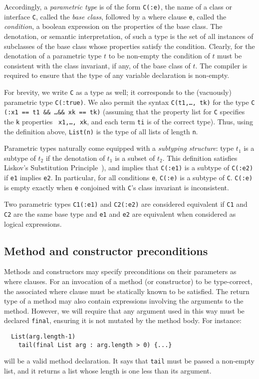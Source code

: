 \documentclass[nocopyrightspace,preprint,9pt]{sigplanconf}
\begin{document}
Accordingly, a {\em parametric type} is of the form {\tt C(:e)}, the name of
a class or interface {\tt C}, called the {\em base class}, followed by a
where clause {\tt e}, called the {\em condition}, a boolean expression
on the properties of the base class. 
The denotation, or
semantic interpretation, of such a type is the set of all instances
of subclasses of the base class whose properties satisfy the
condition.
Clearly, for the denotation of a parametric type $t$ to be
non-empty the condition of $t$ must be consistent with the class
invariant, if any, of the base class of $t$.  The compiler is required to
ensure that the type of any variable declaration is non-empty.

For brevity, we write {\tt C} as a type as well; it
corresponds to the (vacuously) parametric type {\tt C(:true)}.
We also permit the syntax {\tt C(t1,\ldots, tk)} for
the type {\tt C (:x1 == t1 \&\& \ldots \&\& xk == tk)} (assuming that
the property list for {\tt C} specifies the {\tt k} properties {\tt
x1,\ldots, xk}, and each term {\tt ti} is of the correct
type). Thus, using the definition above, {\tt List(n)} is the type of
all lists of length {\tt n}.

Parametric types naturally come equipped with a {\em subtyping
structure}: type $t_1$ is a subtype of $t_2$ if the denotation of
$t_1$ is a subset of $t_2$. This definition satisfies
Liskov's Substitution Principle~\cite{liskov-behaviors}),
and implies that
{\tt C(:e1)} is a subtype of {\tt C(:e2)} if {\tt e1} implies {\tt e2}.
In particular, for all conditions {\tt e},
{\tt C(:e)} is a subtype of {\tt C}.
{\tt C(:e)} is empty exactly
when {\tt e} conjoined with {\tt C}'s class invariant is inconsistent.

Two parametric types {\tt C1(:e1)} and {\tt C2(:e2)} are considered equivalent
if {\tt C1} and {\tt C2} are the same base type and {\tt e1} and
{\tt e2} are equivalent when considered as logical expressions.

\subsection{Method and constructor preconditions}

Methods and constructors may specify preconditions
on their parameters as where clauses.
For an invocation of a method (or
constructor) to be type-correct, the
associated where clause must be statically known to be satisfied. The
return type of a method may also contain expressions involving the
arguments to the method. However, we will require
that any argument used in this way must be declared {\tt final},
ensuring it is not mutated by the method body.
For instance:
\begin{verbatim}
  List(arg.length-1)
    tail(final List arg : arg.length > 0) {...}
\end{verbatim}
\noindent will be a valid method declaration. It says that
{\tt tail} must be passed a non-empty list, and it returns a list
whose length is one less than its argument.
\end{document}
